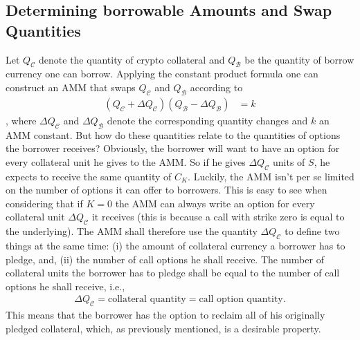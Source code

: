 \documentclass[a4paper]{article}
\begin{document}
\subsection{Determining borrowable Amounts and Swap Quantities}
\label{sec:determining_borrowable_amounts}

Let $Q_{\mathcal{C}}$ denote the quantity of crypto collateral and $Q_\mathcal{B}$ be the quantity of borrow currency one can borrow. Applying the constant product formula one can construct an AMM that swaps $Q_{\mathcal{C}}$ and $Q_\mathcal{B}$ according to
\begin{equation}
\label{eq:constant_product_amm}
\begin{split}
(Q_\mathcal{C}+\Delta Q_\mathcal{C})(Q_\mathcal{B}-\Delta Q_\mathcal{B}) &= k
\end{split}
\end{equation}
, where $\Delta Q_\mathcal{C}$ and $\Delta Q_\mathcal{B}$ denote the corresponding quantity changes and $k$ an AMM constant. But how do these quantities relate to the quantities of options the borrower receives? Obviously, the borrower will want to have an option for every collateral unit he gives to the AMM. So if he gives $\Delta Q_{\mathcal{C}}$ units of $S$, he expects to receive the same quantity of $C_K$. Luckily, the AMM isn't per se limited on the number of options it can offer to borrowers. This is easy to see when considering that if $K=0$ the AMM can always write an option for every collateral unit $\Delta Q_{\mathcal{C}}$ it receives (this is because a call with strike zero is equal to the underlying). The AMM shall therefore use the quantity $\Delta Q_{\mathcal{C}}$ to define two things at the same time: (i) the amount of collateral currency a borrower has to pledge, and, (ii) the number of call options he shall receive. The number of collateral units the borrower has to pledge shall be equal to the number of call options he shall receive, i.e.,
\begin{equation}
\begin{split}
\Delta Q_{\mathcal{C}} = \textrm{collateral quantity} = \textrm{call option quantity}.
\end{split}
\end{equation}
This means that the borrower has the option to reclaim all of his originally pledged collateral, which, as previously mentioned, is a desirable property.\\
\end{document}
